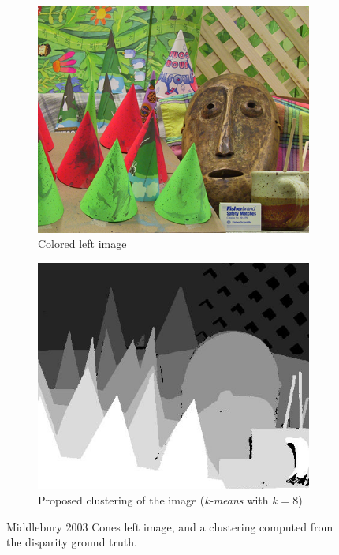 \begin{figure}
    \centering
    \begin{subfigure}[t]{0.5\linewidth}
        \centering
        \includegraphics[width=0.9\linewidth]{Images/Chap_4/im2.png}
        \caption{Colored left image}
        \label{fig:color_cones_image}
    \end{subfigure}\hfill
    \begin{subfigure}[t]{0.5\linewidth}
        \centering
        \includegraphics[width=0.9\linewidth]{Images/Chap_4/cluster.jpg}
        \caption{Proposed clustering of the image (\textit{k-means} with $k=8$)}
        \label{fig:cluster}
    \end{subfigure}
    \caption{Middlebury 2003 Cones left image, and a clustering computed from the disparity ground truth.}
    \label{fig:clustering_example}
\end{figure}


